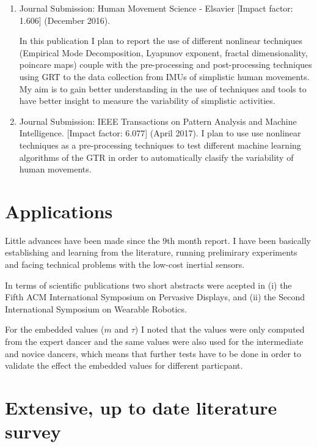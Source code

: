 \documentclass[12pt,journal,onecolumn,compsoc]{IEEEtran}
\begin{document}
\begin{enumerate}
 \item Journal Submission: Human Movement Science - Elsavier [Impact factor: 1.606] (December 2016).
 
In this publication I plan to report the use of different nonlinear techniques 
(Empirical Mode Decomposition, Lyapunov exponent, fractal dimensionality, poincare maps)
couple with the pre-processing and post-processing techniques using GRT 
to the data collection from IMUs of simplistic human movements.
My aim is to gain better understanding 
in the use of techniques and tools to have better insight to measure the variability 
of simplistic activities.

\item Journal Submission: IEEE Transactions on Pattern Analysis and Machine Intelligence.
[Impact factor: 6.077] (April 2017).
I plan to use use nonlinear techniques as a pre-processing techniques 
to test different machine learning algorithms of the GTR in order 
to automatically clasify the variability of human movements. 


\end{enumerate}




\section{Applications}

Little advances have been made since the 9th month report.
I have been basically establishing and learning 
from the literature, running prelimirary experiments 
and facing technical problems with the low-cost inertial sensors. 

In terms of scientific publications two short abstracts were acepted in
(i) the Fifth ACM International Symposium on Pervasive Displays, and 
(ii) the Second International Symposium on Wearable Robotics.

For the embedded values ($m$ and $\tau$) I noted that the values were 
only computed from the expert dancer and 
the same values were also used for the intermediate and novice dancers,
which means that further tests have to be done in order to validate the 
effect the embedded values for different particpant.


\appendices

\section{Extensive, up to date literature survey}
\end{document}
